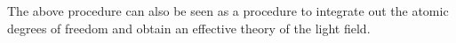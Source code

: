 \documentclass[hyperref, a4paper]{article}
\begin{document}
The above procedure can also be seen as a procedure 
to integrate out the atomic degrees of freedom and  
obtain an effective theory of the light field.

\end{document}
